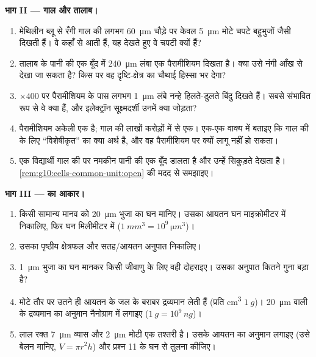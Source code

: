 \begin{problem}
\medskip
\noindent\textbf{भाग II --- गाल और तालाब।}
\begin{enumerate}[resume]
  \item मेथिलीन ब्लू से रँगी गाल की  लगभग \qty{60}{\micro m}
        चौड़े पर केवल \qty{5}{\micro m} मोटे चपटे बहुभुजों जैसी दिखती
        हैं। वे कहाँ से आती हैं, यह देखते हुए वे चपटी क्यों हैं?
  \item तालाब के पानी की एक बूँद में \qty{240}{\micro m} लंबा एक
        पैरामीशियम दिखता है। क्या उसे नंगी आँख से देखा जा सकता है? किस
         पर वह दृष्टि-क्षेत्र का चौथाई हिस्सा भर देगा?
  \item $\times 400$ पर पैरामीशियम के पास लगभग \qty{1}{\micro m} लंबे
        नन्हे हिलते-डुलते बिंदु दिखते हैं। सबसे संभावित रूप से वे क्या
        हैं, और इलेक्ट्रॉन सूक्ष्मदर्शी उनमें क्या जोड़ता?
  \item पैरामीशियम अकेली एक  है; गाल की  लाखों करोड़ों में
        से एक। एक-एक वाक्य में बताइए कि गाल की  के लिए
        ``विशेषीकृत'' का क्या अर्थ है, और वह पैरामीशियम पर क्यों लागू
        नहीं हो सकता।
  \item एक विद्यार्थी गाल की  पर नमकीन पानी की एक बूँद डालता है
        और उन्हें सिकुड़ते देखता है।
        \cref{rem:g10:cells-common-unit:open} की मदद से समझाइए।
\end{enumerate}

\medskip
\noindent\textbf{भाग III ---  का आकार।}
\begin{enumerate}[resume]
  \item किसी सामान्य मानव  को \qty{20}{\micro m} भुजा का घन
        मानिए। उसका आयतन घन माइक्रोमीटर में निकालिए, फिर घन मिलीमीटर में
        ($\qty{1}{mm^3} = 10^9\,\unit{\micro m^3}$)।
  \item उसका पृष्ठीय क्षेत्रफल और सतह/आयतन अनुपात निकालिए।
  \item \qty{1}{\micro m} भुजा का घन मानकर किसी जीवाणु के लिए वही
        दोहराइए। उसका अनुपात कितने गुना बड़ा है?
  \item {} मोटे तौर पर उतने ही आयतन के जल के बराबर द्रव्यमान लेती
        हैं (प्रति \unit{cm^3} $\qty{1}{g}$)। \qty{20}{\micro m} वाली
         के द्रव्यमान का अनुमान नैनोग्राम में लगाइए
        ($\qty{1}{g} = 10^9\,\unit{ng}$)।
  \item लाल रक्त  \qty{7}{\micro m} व्यास और \qty{2}{\micro m}
        मोटी एक तश्तरी है। उसके आयतन का अनुमान लगाइए (उसे बेलन मानिए,
        $V = \pi r^2 h$) और प्रश्न 11 के घन से तुलना कीजिए।
\end{enumerate}


\end{problem}
